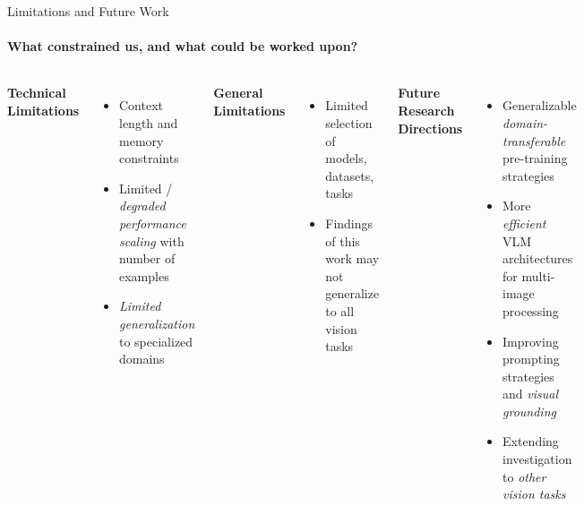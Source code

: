 \begin{frame}{Limitations and Future Work}
\framesubtitle{What constrained us, and what could be worked upon?}
  \vspace{-1em}
  \begin{columns}[T]
    \column{\customcolumnwidth}
      \textbf{Technical Limitations}
      \begin{itemize}
        \item Context length and memory constraints
        \item Limited / \emph{degraded performance scaling} with number of examples
        \item \emph{Limited generalization} to specialized domains
      \end{itemize}
      \textbf{General Limitations}
      \begin{itemize}
        \item Limited selection of models, datasets, tasks
        \item Findings of this work may not generalize to all vision tasks
      \end{itemize}
      \column{\customcolumnwidth}
      \textbf{Future Research Directions}
      \begin{itemize}
        \item Generalizable \emph{domain-transferable} pre-training strategies
        \item More \emph{efficient} VLM architectures for multi-image processing
        \item Improving prompting strategies and \emph{visual grounding}~
        \item Extending investigation to \emph{other vision tasks}
      \end{itemize}
  \end{columns}
\end{frame}
